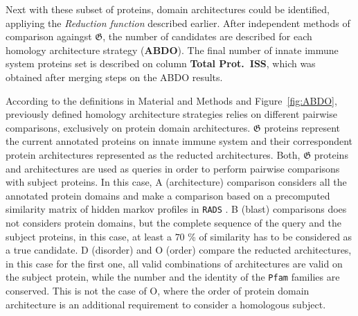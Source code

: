 \documentclass[11pt]{article}
\newcommand{\TODO}[1]{\begingroup\color{red}#1\endgroup}
\begin{document}
Next with these subset of proteins, domain architectures could be identified, appliying 
the \textsl{Reduction function} described earlier. After independent methods of comparison 
againgst $\boldsymbol{\mathfrak{G}}$, the number of candidates are described for 
each homology architecture strategy (\textbf{ABDO}). The final number of innate 
immune system proteins set is described on column \textbf{Total Prot.\ ISS}, which was 
obtained after merging steps on the ABDO results.

According to the definitions in Material and Methods and Figure~\ref{fig:ABDO}, 
previously defined homology architecture strategies relies on different pairwise 
comparisons, exclusively on protein domain architectures. $\boldsymbol{\mathfrak{G}}$
proteins represent the current annotated proteins on innate immune system and 
their correspondent protein architectures represented as the reducted architectures.
Both, $\boldsymbol{\mathfrak{G}}$ proteins and architectures are used as queries 
in order to perform pairwise comparisons with subject proteins. In this case, 
A (architecture) comparison considers all the annotated protein domains and make a 
comparison based on a precomputed similarity matrix of \TODO{hidden markov profiles} 
in \texttt{RADS} \cite{Terrapon:2014}. B (blast) comparisons does not considers protein 
domains, but the complete sequence of the query and the subject proteins, in this case, 
at least a $70$ \% of similarity has to be considered as a true candidate. D (disorder) 
and O (order) compare the reducted architectures, in this case for the first one, 
all valid combinations of architectures are valid on the subject protein, while the 
number and the identity of the \texttt{Pfam} families are conserved. This is not the case 
of O, where the order of protein domain architecture is an additional requirement to 
consider a homologous subject. 
\end{document}
